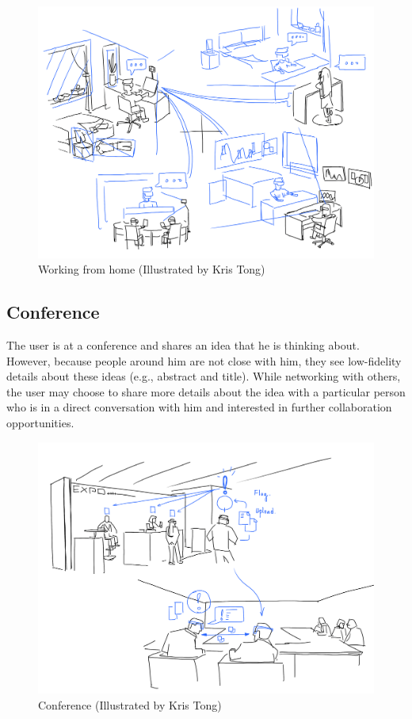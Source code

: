 \begin{figure}[H]
    \centering
    \includegraphics[width=.8\linewidth]{images/illustrations/2_Group_Meeting.png}
    \caption{Working from home (Illustrated by Kris Tong)}
    \label{fig:illustration:group-meeting}
\end{figure}

\subsection{Conference}

The user is at a conference and shares an idea that he is thinking about. However, because people around him are not close with him, they see low-fidelity details about these ideas (e.g., abstract and title). While networking with others, the user may choose to share more details about the idea  with a particular person who is in a direct conversation with him and interested in further collaboration opportunities.

\begin{figure}[H]
    \centering
    \includegraphics[width=.8\linewidth]{images/illustrations/4_Flag_On_Conference.png}
    \caption{Conference (Illustrated by Kris Tong)}
    \label{fig:illustration:conference}
\end{figure}


